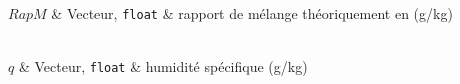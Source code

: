 \begin{tabarg}
\\
\hline
$RapM$ & Vecteur, \texttt{float} & rapport de m\'elange th\'eoriquement en  (g/kg)\\
\end{tabarg}

\medskip
\begin{tabarg}
\\
\hline
$q$ & Vecteur, \texttt{float} & humidit\'e sp\'ecifique (g/kg)\\
\end{tabarg}
